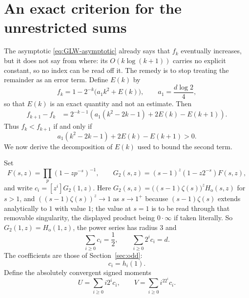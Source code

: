 \documentclass[11pt]{amsart}
\theoremstyle{plain}
\theoremstyle{definition}
\begin{document}
\section{An exact criterion for the unrestricted sums}

The asymptotic \eqref{eq:GLW-asymptotic} already says that $f_k$ eventually
increases, but it does not say from where: its $O(k\log(k+1))$ carries no
explicit constant, so no index can be read off it. The remedy is to stop
treating the remainder as an error term. Define $E(k)$ by
\begin{equation}\label{eq:E-definition}
  f_k=1-2^{-k}\bigl(a_1k^2+E(k)\bigr),
  \qquad a_1=\frac{d\log2}{4},
\end{equation}
so that $E(k)$ is an exact quantity and not an estimate.
Then
\begin{align}
 f_{k+1}-f_k
 &=2^{-k-1}\left(a_1(k^2-2k-1)+2E(k)-E(k+1)\right).
 \label{eq:full-difference}
\end{align}
Thus $f_k<f_{k+1}$ if and only if
\begin{equation}\label{eq:full-criterion}
 a_1(k^2-2k-1)+2E(k)-E(k+1)>0.
\end{equation}
We now derive the decomposition of $E(k)$ used to bound the second term.

Set
\[
 F(s,z)=\prod_p(1-zp^{-s})^{-1},
 \qquad
 G_2(s,z)=(s-1)^z(1-z2^{-s})F(s,z),
\]
and write $c_i=[z^i]G_2(1,z)$. Here $G_2(s,z)=\bigl((s-1)\zeta(s)\bigr)^z
H_{\mathrm o}(s,z)$ for $s>1$, and $((s-1)\zeta(s))^z\to1$ as $s\to1^+$
because $(s-1)\zeta(s)$ extends analytically to $1$ with value $1$; the
value at $s=1$ is to be read through that removable singularity, the
displayed product being $0\cdot\infty$ if taken literally. So
$G_2(1,z)=H_{\mathrm o}(1,z)$, the power series has radius $3$ and
\begin{equation}\label{eq:c-moments}
  \sum_{i\geq0}c_i=\frac12,
  \qquad
  \sum_{i\geq0}2^ic_i=d.
\end{equation}
The coefficients are those of Section~\ref{sec:odd}:
\begin{equation}\label{eq:ci-equals-hi}
  c_i=h_i(1).
\end{equation}
Define the absolutely convergent signed moments
\begin{equation}\label{eq:UV-def}
 U=\sum_{i\geq0}i2^ic_i,
 \qquad
 V=\sum_{i\geq0}i^22^ic_i.
\end{equation}
\end{document}
